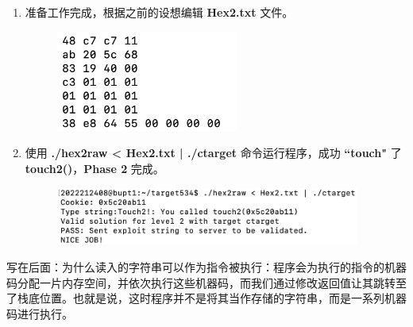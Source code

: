 \begin{enumerate}
            \item 准备工作完成，根据之前的设想编辑 \textbf{Hex2.txt} 文件。
                \begin{figure}[htbp]
                    \hspace*{1.5cm}
                    \includegraphics*[width = 6cm]{s2_5.png}
                \end{figure}
            \item 使用 \textbf{./hex2raw < Hex2.txt | ./ctarget} 命令运行程序，成功 \textbf{``touch"} 了 \textbf{touch2()}，\textbf{Phase 2} 完成。
                \begin{figure}[htbp]
                    \hspace*{1.5cm}
                    \includegraphics*[width = 10cm]{s2_6.png}
                \end{figure}
        \end{enumerate}
    \par 写在后面：为什么读入的字符串可以作为指令被执行：程序会为执行的指令的机器码分配一片内存空间，并依次执行这些机器码，而我们通过修改返回值让其跳转至了栈底位置。也就是说，这时程序并不是将其当作存储的字符串，而是一系列机器码进行执行。
    
